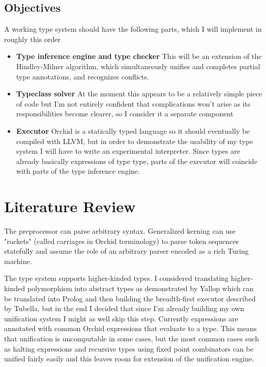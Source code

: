 \documentclass{article}
\begin{document}
\subsection{Objectives}

A working type system should have the following parts, which I will implement in roughly this order

\begin{itemize}
  \item \textbf{Type inference engine and type checker} This will be an extension of
    the Hindley-Milner algorithm, which simultaneously unifies and completes partial type
    annotations, and recognizes conflicts.
  \item \textbf{Typeclass solver} At the moment this appears to be a relatively simple piece of
    code but I'm not entirely confident that complications won't arise as its responsibilities
    become clearer, so I consider it a separate component
  \item \textbf{Executor} Orchid is a statically typed language so it should eventually be compiled
    with LLVM, but in order to demonstrate the usability of my type system I will have to write
    an experimental interpreter. Since types are already basically expressions of type type,
    parts of the executor will coincide with parts of the type inference engine.
\end{itemize}

\section{Literature Review}

The preprocessor can parse arbitrary syntax. Generalized kerning can use "rockets"
(called carriages in Orchid terminology) to parse token sequences statefully and assume
the role of an arbitrary parser encoded as a rich Turing machine.\cite{suckerpinch}

The type system supports higher-kinded types. I considered translating higher-kinded polymorphism
into abstract types as demonstrated by Yallop\cite{yallop} which can be translated into
Prolog and then building the breadth-first executor described by Tubella\cite{tubella}, but
in the end I decided that since I'm already building my own unification system I might as well
skip this step. Currently expressions are annotated with common Orchid expressions that evaluate to
a type. This means that unification is uncomputable in some cases, but the most common cases
such as halting expressions and recursive types using fixed point combinators can be unified
fairly easily and this leaves room for extension of the unification engine.
\end{document}
